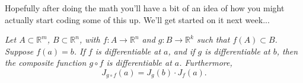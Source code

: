 \documentclass{article}
\newcommand{\R}{\mathbb{R}}
\newenvironment{envsection}[1]{\begin{trivlist}
\item[\hskip \labelsep {\bfseries #1}]}{\end{trivlist}}
\begin{document}
\noindent Hopefully after doing the math you'll have a bit of an idea of how you might actually start coding some of this up. We'll get started on it next week...

\newpage

\begin{envsection}{Theorem (Chain Rule).}
    \textit{Let $A \subset \R^m$, $B \subset \R^n$, with $f: A \to \R^n$ and $g: B \to \R^k$ such that $f(A) \subset B$. Suppose $f(a) = b$. If $f$ is differentiable at $a$, and if $g$ is differentiable at $b$, then the composite function $g \circ f$ is differentiable at $a$. Furthermore,
    \[
    J_{g \circ f}(a) = J_g(b) \cdot J_f(a).
    \]}
\end{envsection}
\end{document}
